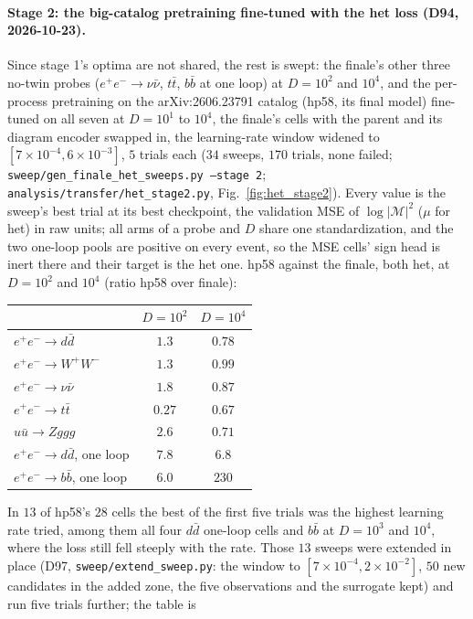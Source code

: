 \documentclass[11pt]{article}
\newcommand{\code}[1]{\texttt{#1}}
\begin{document}
\paragraph{Stage 2: the big-catalog pretraining fine-tuned with the het loss (D94, 2026-10-23).} Since stage 1's optima are
not shared, the rest is swept: the finale's other three no-twin probes ($e^+e^-\to\nu\bar\nu$, $t\bar t$, $b\bar b$ at one loop)
at $D=10^2$ and $10^4$, and the per-process pretraining on the arXiv:2606.23791 catalog (hp58, its final model) fine-tuned on
all seven at $D=10^1$ to $10^4$, the finale's cells with the parent and its diagram encoder swapped in, the learning-rate
window widened to $[7\times10^{-4},6\times10^{-3}]$, $5$ trials each ($34$ sweeps, $170$ trials, none failed;
\code{sweep/gen\_finale\_het\_sweeps.py --stage 2}; \code{analysis/transfer/het\_stage2.py}, Fig.~\ref{fig:het_stage2}).
Every value is the sweep's best trial at its best checkpoint, the validation MSE of $\log|\mathcal M|^2$ ($\mu$ for het)
in raw units; all arms of a probe and $D$ share one standardization, and the two one-loop pools are positive on every
event, so the MSE cells' sign head is inert there and their target is the het one. hp58 against the finale, both het, at
$D=10^2$ and $10^4$ (ratio hp58 over finale):
\begin{center}
\begin{tabular}{lcc}
 & $D=10^2$ & $D=10^4$ \\ \hline
$e^+e^-\to d\bar d$ & $1.3$ & $0.78$ \\
$e^+e^-\to W^+W^-$ & $1.3$ & $0.99$ \\
$e^+e^-\to\nu\bar\nu$ & $1.8$ & $0.87$ \\
$e^+e^-\to t\bar t$ & $0.27$ & $0.67$ \\
$u\bar u\to Zggg$ & $2.6$ & $0.71$ \\
$e^+e^-\to d\bar d$, one loop & $7.8$ & $6.8$ \\
$e^+e^-\to b\bar b$, one loop & $6.0$ & $230$ \\
\end{tabular}
\end{center}
In $13$ of hp58's $28$ cells the best of the first five trials was the highest learning rate tried, among them all four
$d\bar d$ one-loop cells and $b\bar b$ at $D=10^3$ and $10^4$, where the loss still fell steeply with the rate. Those $13$
sweeps were extended in place (D97, \code{sweep/extend\_sweep.py}: the window to $[7\times10^{-4},2\times10^{-2}]$, $50$ new
candidates in the added zone, the five observations and the surrogate kept) and run five trials further; the table is
\end{document}
